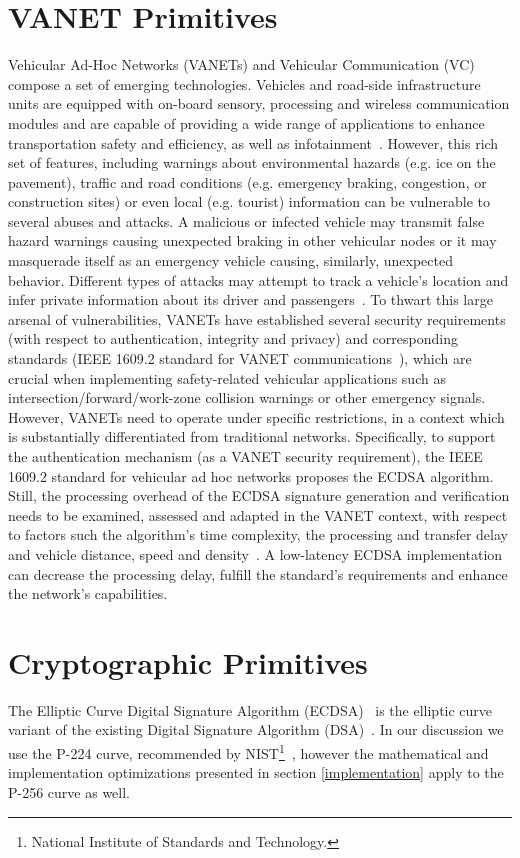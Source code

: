 \documentclass[11pt,twocolumn]{IEEEtran}
\begin{document}
\section{VANET Primitives}\label{vanet}
Vehicular Ad-Hoc Networks (VANETs) and Vehicular Communication (VC) compose a set of emerging technologies. Vehicles and road-side infrastructure units are equipped with on-board sensory,
processing and wireless communication modules and are capable of providing a wide range of applications to enhance transportation safety and efficiency, as well as infotainment~\cite{kargl}. However, this rich set of features, including warnings about environmental hazards (e.g. ice on the pavement), traffic and road conditions (e.g. emergency braking, congestion, or construction sites) or even local (e.g. tourist) information can be vulnerable to several abuses and attacks. A malicious or infected vehicle may transmit false hazard warnings causing unexpected braking in other vehicular nodes or it may masquerade itself as an emergency vehicle causing, similarly, unexpected behavior. Different types of attacks may attempt to track a vehicle's location and infer private information about its driver and passengers~\cite{kargl}. To thwart this large arsenal of vulnerabilities, VANETs have established several security requirements (with respect to authentication, integrity and privacy) and corresponding standards (IEEE 1609.2 standard for VANET communications~\cite{wave}), which are crucial when implementing safety-related vehicular applications such as intersection/forward/work-zone collision warnings or other emergency signals. \\
However, VANETs need to operate under specific restrictions, in a context which is substantially differentiated from traditional networks. Specifically, to support the authentication mechanism (as a VANET security requirement), the IEEE 1609.2 standard for vehicular ad hoc networks proposes the ECDSA algorithm. Still, the processing overhead of the ECDSA signature generation and verification needs to be examined, assessed and adapted in the VANET context, with respect to factors such the algorithm's time complexity, the processing and transfer delay and vehicle distance, speed and density~\cite{petit}. A low-latency ECDSA implementation can decrease the processing delay, fulfill the standard's requirements and enhance the network's capabilities.
\section{Cryptographic Primitives}\label{crypto}
The Elliptic Curve Digital Signature Algorithm (ECDSA)~\cite{certicom} is the elliptic curve variant of the existing Digital Signature Algorithm (DSA)~\cite{dss}. In our discussion we use  the P-224 curve, recommended by NIST\footnote{National Institute of Standards and Technology.}~\cite{dss}, however the mathematical and implementation optimizations presented in section \ref{implementation} apply to the P-256 curve as well.
\end{document}
